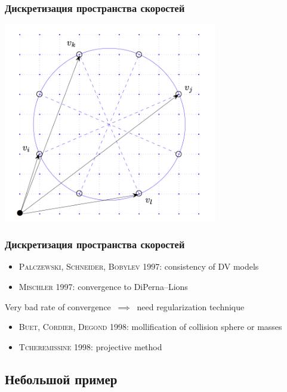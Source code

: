 \documentclass[mathserif]{beamer} %
\newcommand{\Cite}[2][]{\alert{\textsc{#2 #1}}}
\begin{document}
\begin{frame}
    \frametitle{Дискретизация пространства скоростей}
    \begin{center}
    \includegraphics[width=0.7\textwidth]{cutted/dimarco}
    \end{center}
\end{frame}

\begin{frame}
    \frametitle{Дискретизация пространства скоростей}
    \begin{itemize}
        \item \Cite[1997]{Palczewski, Schneider, Bobylev}: consistency of DV models
        \item \Cite[1997]{Mischler}: convergence to DiPerna--Lions
    \end{itemize}
    Very bad rate of convergence \(\:\implies\:\) need regularization technique
    \begin{itemize}
        \item \Cite[1998]{Buet, Cordier, Degond}: mollification of collision sphere or masses
        \item \Cite[1998]{Tcheremissine}: projective method
    \end{itemize}
\end{frame}

\subsection{Небольшой пример}
\end{document}
